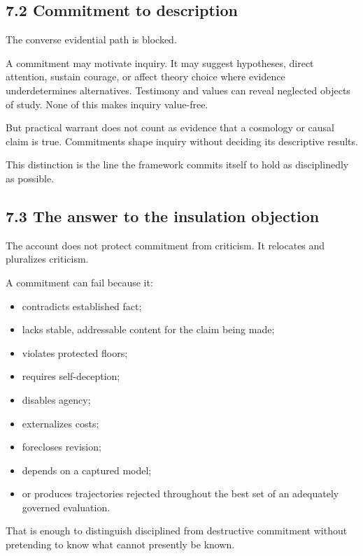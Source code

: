 \documentclass[
  11pt,
]{article}
\providecommand{\tightlist}{%
  \setlength{\itemsep}{0pt}\setlength{\parskip}{0pt}}
\begin{document}
\subsection{7.2 Commitment to
description}\label{commitment-to-description}

The converse evidential path is blocked.

A commitment may motivate inquiry. It may suggest hypotheses, direct
attention, sustain courage, or affect theory choice where evidence
underdetermines alternatives. Testimony and values can reveal neglected
objects of study. None of this makes inquiry value-free.

But practical warrant does not count as evidence that a cosmology or
causal claim is true. Commitments shape inquiry without deciding its
descriptive results.

This distinction is the line the framework commits itself to hold as
disciplinedly as possible.

\subsection{7.3 The answer to the insulation
objection}\label{the-answer-to-the-insulation-objection}

The account does not protect commitment from criticism. It relocates and
pluralizes criticism.

A commitment can fail because it:

\begin{itemize}
\tightlist
\item
  contradicts established fact;
\item
  lacks stable, addressable content for the claim being made;
\item
  violates protected floors;
\item
  requires self-deception;
\item
  disables agency;
\item
  externalizes costs;
\item
  forecloses revision;
\item
  depends on a captured model;
\item
  or produces trajectories rejected throughout the best set of an
  adequately governed evaluation.
\end{itemize}

That is enough to distinguish disciplined from destructive commitment
without pretending to know what cannot presently be known.
\end{document}

